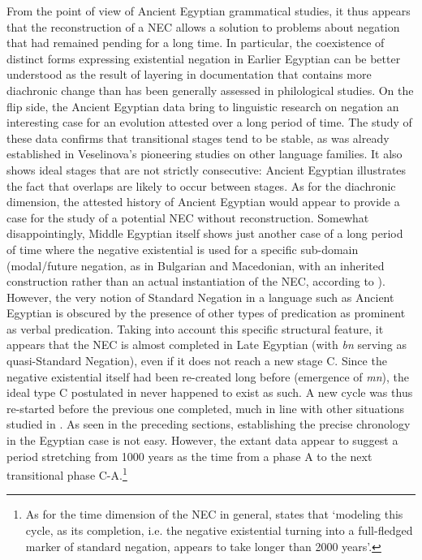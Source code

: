 \documentclass[output=paper]{langsci/langscibook}
\newcommand{\ꜥ}{ʿ}
\newcommand{\ꜣ}{\kern-.25pt\texttt{ꜣ}\kern-.6pt}
\begin{document}
From the point of view of Ancient Egyptian grammatical studies, it thus appears that the reconstruction of a NEC allows a solution to problems about negation that had remained pending for a long time. In particular, the coexistence of distinct forms expressing existential negation in Earlier Egyptian can be better understood as the result of layering in documentation that contains more diachronic change than has been generally assessed in philological studies. On the flip side, the Ancient Egyptian data bring to linguistic research on negation an interesting case for an evolution attested over a long period of time. The study of these data confirms that transitional stages tend to be stable, as was already established in Veselinova’s pioneering studies on other language families. It also shows ideal stages that are not strictly consecutive: Ancient Egyptian illustrates the fact that overlaps are likely to occur between stages. As for the diachronic dimension, the attested history of Ancient Egyptian would appear to provide a case for the study of a potential NEC without reconstruction. Somewhat disappointingly, Middle Egyptian itself shows just another case of a long period of time where the negative existential is used for a specific sub-domain (modal/future negation, as in Bulgarian and Macedonian, with an inherited construction rather than an actual instantiation of the NEC, according to \citealt{Veselinova2014}). However, the very notion of Standard Negation in a language such as Ancient Egyptian is obscured by the presence of other types of predication as prominent as verbal predication. Taking into account this specific structural feature, it appears that the NEC is almost completed in Late Egyptian (with \textit{bn} serving as quasi-Standard Negation), even if it does not reach a new stage C. Since the negative existential itself had been re-created long before (emergence of \textit{mn}), the ideal type C postulated in \citet{Croft1991} never happened to exist as such. A new cycle was thus re-started before the previous one completed, much in line with other situations studied in \citet{Veselinova2016}. As seen in the preceding sections, establishing the precise chronology in the Egyptian case is not easy. However, the extant data appear to suggest a period stretching from 1000 years as the time from a phase A to the next transitional phase C-A.\footnote{As for the time dimension of the NEC in general, \citet[1327]{Veselinova2014} states that ‘modeling this cycle, as its completion, i.e. the negative existential turning into a full-fledged marker of standard negation, appears to take longer than 2000 years’. }
 
\end{document}
